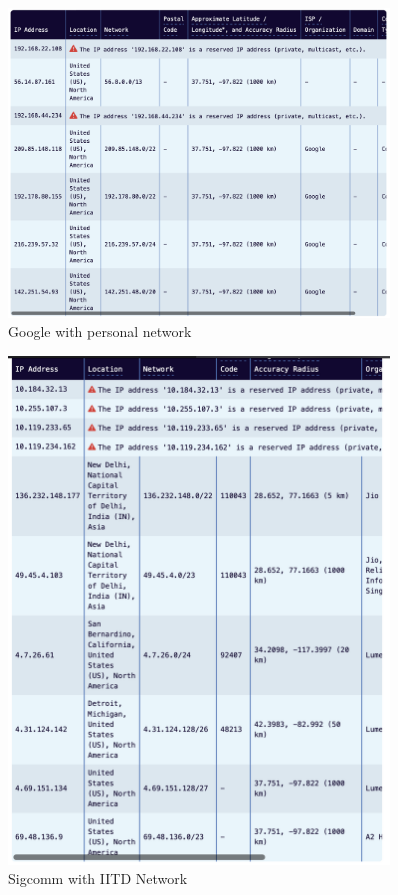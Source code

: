 \documentclass{article}
\begin{document}
\begin{itemize}
    \begin{figure}[H]
    \centering
    \includegraphics[width=0.9\textwidth]{geolocation_google_personal.png}
    \caption*{Google with personal network}
    \end{figure}

    \begin{figure}[H]
    \centering
    \includegraphics[width=0.9\textwidth]{geoloation_sigcomm_iitd.png}
    \caption*{Sigcomm with IITD Network}
    \end{figure}


\end{itemize}
\end{document}

